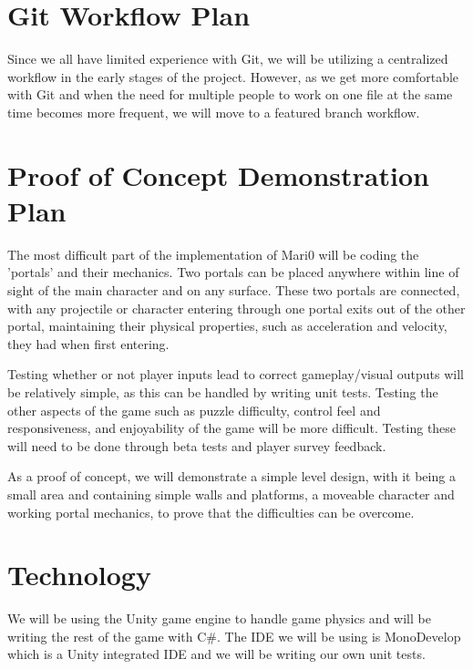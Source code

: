 \documentclass{article}
\begin{document}
\section{Git Workflow Plan}
Since we all have limited experience with Git, we will be utilizing a centralized workflow in the early stages of the project. However, as we get more comfortable with Git and when the need for multiple people to work on one file at the same time becomes more frequent, we will move to a featured branch workflow.
\section{Proof of Concept Demonstration Plan}
The most difficult part of the implementation of Mari0 will be coding the 'portals' and their mechanics. Two portals can be placed anywhere within line of sight of the main character and on any surface. These two portals are connected, with any projectile or character entering through one portal exits out of the other portal, maintaining their physical properties, such as acceleration and velocity, they had when first entering.

Testing whether or not player inputs lead to correct gameplay/visual outputs will be relatively simple, as this can be handled by writing unit tests. Testing the other aspects of the game such as puzzle difficulty, control feel and responsiveness, and enjoyability of the game will be more difficult. Testing these will need to be done through beta tests and player survey feedback.

As a proof of concept, we will demonstrate a simple level design, with it being a small area and containing simple walls and platforms, a moveable character and working portal mechanics, to prove that the difficulties can be overcome.

\section{Technology}
We will be using the Unity game engine to handle game physics and will be writing the rest of the game with C\#.
The IDE we will be using is MonoDevelop which is a Unity integrated IDE and we will be writing our own unit tests.
\end{document}
